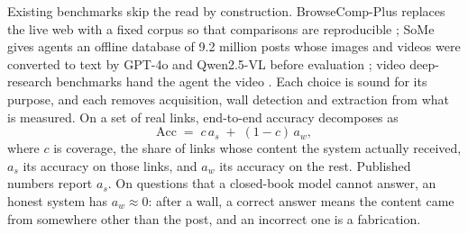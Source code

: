 \documentclass[11pt]{article}
\begin{document}
Existing benchmarks skip the read by construction. BrowseComp-Plus replaces the live web with a fixed
corpus so that comparisons are reproducible \citep{chen2025browsecompplus}; SoMe gives agents an offline
database of 9.2 million posts whose images and videos were converted to text by GPT-4o and Qwen2.5-VL
before evaluation \citep{xue2026some}; video deep-research benchmarks hand the agent the video
\citep{liu2026videodr,meng2026omnidr,liang2026groundedvdr}. Each choice is sound for its purpose, and each
removes acquisition, wall detection and extraction from what is measured. On a set of real links,
end-to-end accuracy decomposes as
\begin{equation}\label{eq:decomp}
  \mathrm{Acc} \;=\; c\,a_{s} \;+\; (1-c)\,a_{w},
\end{equation}
where $c$ is coverage, the share of links whose content the system actually received, $a_s$ its accuracy
on those links, and $a_w$ its accuracy on the rest. Published numbers report $a_s$. On questions that a
closed-book model cannot answer, an honest system has $a_w \approx 0$: after a wall, a correct answer means
the content came from somewhere other than the post, and an incorrect one is a fabrication.
\end{document}
